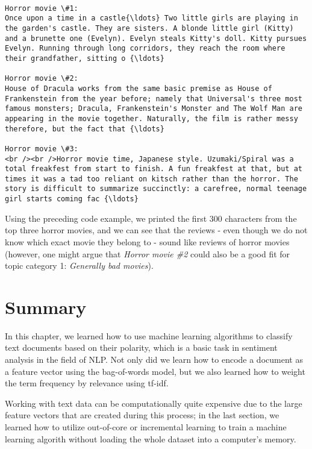 \documentclass[11pt]{article}
\begin{document}
    \begin{Verbatim}[commandchars=\\\{\}]

Horror movie \#1:
Once upon a time in a castle{\ldots} Two little girls are playing in the garden's castle. They are sisters. A blonde little girl (Kitty) and a brunette one (Evelyn). Evelyn steals Kitty's doll. Kitty pursues Evelyn. Running through long corridors, they reach the room where their grandfather, sitting o {\ldots}

Horror movie \#2:
House of Dracula works from the same basic premise as House of Frankenstein from the year before; namely that Universal's three most famous monsters; Dracula, Frankenstein's Monster and The Wolf Man are appearing in the movie together. Naturally, the film is rather messy therefore, but the fact that {\ldots}

Horror movie \#3:
<br /><br />Horror movie time, Japanese style. Uzumaki/Spiral was a total freakfest from start to finish. A fun freakfest at that, but at times it was a tad too reliant on kitsch rather than the horror. The story is difficult to summarize succinctly: a carefree, normal teenage girl starts coming fac {\ldots}

    \end{Verbatim}

    Using the preceding code example, we printed the first 300 characters
from the top three horror movies, and we can see that the reviews - even
though we do not know which exact movie they belong to - sound like
reviews of horror movies (however, one might argue that \emph{Horror
movie \#2} could also be a good fit for topic category 1:
\emph{Generally bad movies}).

    \section{Summary}\label{summary}

    In this chapter, we learned how to use machine learning algorithms to
classify text documents based on their polarity, which is a basic task
in sentiment analysis in the field of NLP. Not only did we learn how to
encode a document as a feature vector using the bag-of-words model, but
we also learned how to weight the term frequency by relevance using
tf-idf.

Working with text data can be computationally quite expensive due to the
large feature vectors that are created during this process; in the last
section, we learned how to utilize out-of-core or incremental learning
to train a machine learning algorith without loading the whole dataset
into a computer's memory.
\end{document}
